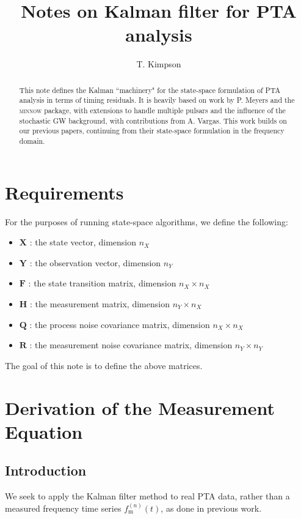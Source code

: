\documentclass[]{scrartcl}
\title{Notes on Kalman filter for PTA analysis}
\author{T. Kimpson}
\begin{document}
\maketitle
\begin{abstract}
	This note defines the Kalman ``machinery" for the state-space formulation of PTA analysis in terms of timing residuals. It is heavily based on work by P. Meyers and the \textsc{minnow} package, with extensions to handle multiple pulsars and the influence of the stochastic GW background, with contributions from A. Vargas. This work builds on our previous papers, continuing from their state-space formulation in the frequency domain.
\end{abstract}

\section{Requirements}

For the purposes of running state-space algorithms, we define the following:

\begin{itemize}
	\item $\boldsymbol{X}$ : the state vector, dimension $n_X$
	\item $\boldsymbol{Y}$ : the observation vector, dimension $n_Y$
	\item $\boldsymbol{F}$ : the state transition matrix, dimension $n_X \times n_X$
	\item $\boldsymbol{H}$ : the measurement matrix, dimension $n_Y \times n_X$
	\item $\boldsymbol{Q}$ : the process noise covariance matrix, dimension $n_X \times n_X$
	\item $\boldsymbol{R}$ : the measurement noise covariance matrix, dimension $n_Y \times n_Y$
\end{itemize}

The goal of this note is to define the above matrices.

\section{Derivation of the Measurement Equation}

\subsection{Introduction}
We seek to apply the Kalman filter method to real PTA data, rather than a measured frequency time series $f_{\textrm{m}}^{(n)}(t)$, as done in previous work. \newline 
\end{document}
